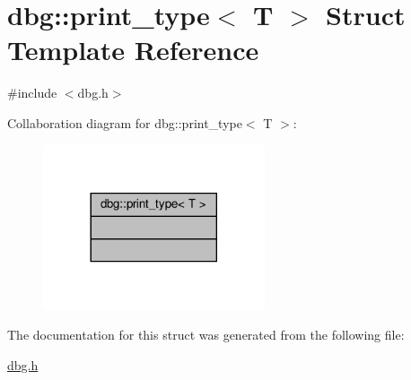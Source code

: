 \hypertarget{structdbg_1_1print__type}{}\section{dbg\+:\+:print\+\_\+type$<$ T $>$ Struct Template Reference}
\label{structdbg_1_1print__type}


{\ttfamily \#include $<$dbg.\+h$>$}



Collaboration diagram for dbg\+:\+:print\+\_\+type$<$ T $>$\+:\nopagebreak
\begin{figure}[H]
\begin{center}
\leavevmode
\includegraphics[width=185pt]{de/d99/structdbg_1_1print__type__coll__graph}
\end{center}
\end{figure}


The documentation for this struct was generated from the following file\+:\begin{DoxyCompactItemize}
\item 
\hyperlink{dbg_8h}{dbg.\+h}\end{DoxyCompactItemize}
